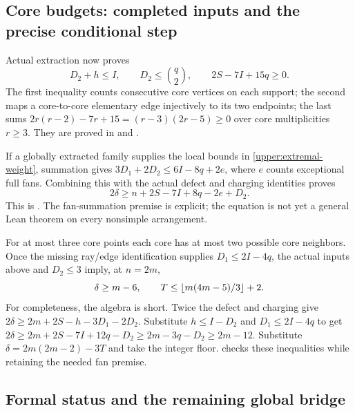 \subsection{Core budgets: completed inputs and the precise conditional step}

Actual extraction now proves
\begin{equation}
 D_2+h\le I,\qquad D_2\le\binom q2,\qquad
 2S-7I+15q\ge0.
 \label{upper:core-inputs}
\end{equation}
The first inequality counts consecutive core vertices on each support;
the second maps a core-to-core elementary edge injectively to its two
endpoints; the last sums $2r(r-2)-7r+15=(r-3)(2r-5)\ge0$ over core
multiplicities $r\ge3$. They are proved in
 and .

If a globally extracted family supplies the local bounds in
\eqref{upper:extremal-weight}, summation gives
$3D_1+2D_2\le6I-8q+2e$, where $e$ counts exceptional full fans.
Combining this with the actual defect and charging identities proves
\begin{equation}
 2\delta\ge n+2S-7I+8q-2e+D_2.
 \label{upper:refined-conditional}
\end{equation}
This is
.
The fan-summation premise is explicit; the equation is not yet a general
Lean theorem on every nonsimple arrangement.

For at most three core points each core has at most two possible core
neighbors. Once the missing ray/edge identification supplies
$D_1\le2I-4q$, the actual inputs above and $D_2\le3$ imply, at $n=2m$,
\begin{equation}
 \delta\ge m-6,\qquad
 T\le\left\lfloor m(4m-5)/3\right\rfloor+2.
 \label{upper:three-core-conditional}
\end{equation}
For completeness, the algebra is short. Twice the defect and charging
give $2\delta\ge2m+2S-h-3D_1-2D_2$. Substitute
$h\le I-D_2$ and $D_1\le2I-4q$ to get
$2\delta\ge2m+2S-7I+12q-D_2\ge2m-3q-D_2\ge2m-12$.
Substitute $\delta=2m(2m-2)-3T$ and take the integer floor.
checks these inequalities while retaining the needed fan premise.

\subsection{Formal status and the remaining global bridge}

